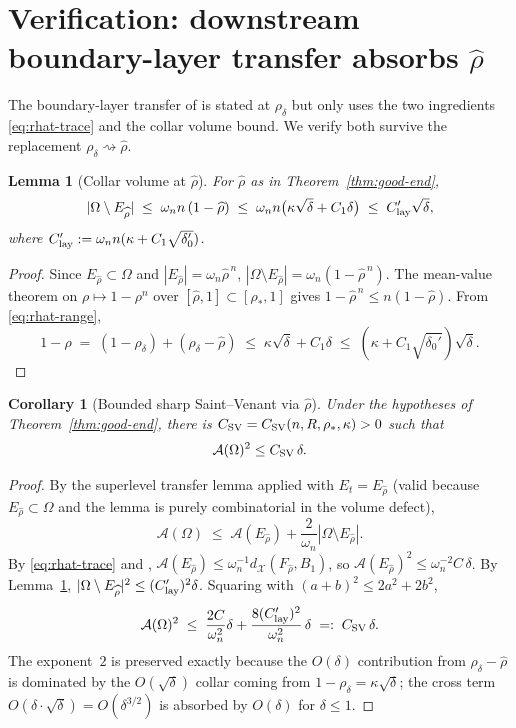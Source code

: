 \documentclass[11pt]{article}
\newtheorem{lemma}[theorem]{Lemma}
\newtheorem{corollary}[theorem]{Corollary}
\theoremstyle{definition}
\newcommand{\Fr}{\mathcal{A}}
\newcommand{\Om}{\Omega}
\newcommand{\rstar}{\rho_{*}}
\newcommand{\rdel}{\rho_\delta}
\newcommand{\rhad}{\widehat\rho}
\newcommand{\X}{\mathcal X}
\begin{document}
\section{Verification: downstream boundary-layer transfer absorbs
$\rhad$}\label{sec:downstream}

The boundary-layer transfer of \cite{BoundaryLayerTransfer} is stated
at $\rdel$ but only uses the two ingredients
\eqref{eq:rhat-trace} and the collar volume bound.  We verify both
survive the replacement $\rdel\rightsquigarrow\rhad$.

\begin{lemma}[Collar volume at $\rhad$]\label{lem:collar-good}
For $\rhad$ as in Theorem~\ref{thm:good-end},
\begin{equation}\label{eq:collar-good}
   |\Om\setminus E_{\rhad}|\;\le\;\omega_n n\,(1-\rhad)
   \;\le\;\omega_n n\bigl(\kappa\sqrt\delta+C_1\delta\bigr)
   \;\le\;C_{\rm lay}'\sqrt\delta,
\end{equation}
where $C_{\rm lay}':=\omega_n n(\kappa+C_1\sqrt{\delta_0'})$.
\end{lemma}

\begin{proof}
Since $E_{\rhad}\subset\Om$ and $|E_{\rhad}|=\omega_n\rhad^{\,n}$,
$|\Om\setminus E_{\rhad}|=\omega_n(1-\rhad^{\,n})$.  The mean-value
theorem on $\rho\mapsto 1-\rho^n$ over $[\rhad,1]\subset[\rstar,1]$
gives $1-\rhad^{\,n}\le n(1-\rhad)$.  From \eqref{eq:rhat-range},
\[
   1-\rhad\;=\;(1-\rdel)+(\rdel-\rhad)\;\le\;\kappa\sqrt\delta+C_1\delta
   \;\le\;(\kappa+C_1\sqrt{\delta_0'})\sqrt\delta.
\]
\end{proof}

\begin{corollary}[Bounded sharp Saint--Venant via $\rhad$]\label{cor:SV-good}
Under the hypotheses of Theorem~\ref{thm:good-end}, there is
$C_{\rm SV}=C_{\rm SV}(n,R,\rstar,\kappa)>0$ such that
\begin{equation}\label{eq:SV-good}
   \Fr(\Om)^{2}\le C_{\rm SV}\,\delta.
\end{equation}
\end{corollary}

\begin{proof}
By the superlevel transfer lemma
\cite[Lemma~4.2]{BoundaryLayerTransfer} applied with $E_t=E_{\rhad}$
(valid because $E_{\rhad}\subset\Om$ and the lemma is purely
combinatorial in the volume defect),
\[
   \Fr(\Om)\;\le\;\Fr(E_{\rhad})+\frac{2}{\omega_n}|\Om\setminus E_{\rhad}|.
\]
By \eqref{eq:rhat-trace} and \cite[Rem.~2.4]{BoundaryLayerTransfer},
$\Fr(E_{\rhad})\le \omega_n^{-1}d_\X(F_{\rhad},B_1)$, so
$\Fr(E_{\rhad})^2\le \omega_n^{-2}C\,\delta$.  By
Lemma~\ref{lem:collar-good},
$|\Om\setminus E_{\rhad}|^2\le (C_{\rm lay}')^2\delta$.
Squaring with $(a+b)^2\le 2a^2+2b^2$,
\[
   \Fr(\Om)^2
   \;\le\; \frac{2C}{\omega_n^{2}}\delta
      + \frac{8(C_{\rm lay}')^2}{\omega_n^{2}}\,\delta
   \;=:\;C_{\rm SV}\,\delta.
\]
The exponent~$2$ is preserved exactly because the $O(\delta)$
contribution from $\rdel-\rhad$ is dominated by the
$O(\sqrt\delta)$ collar coming from $1-\rdel=\kappa\sqrt\delta$; the
cross term $O(\delta\cdot\sqrt\delta)=O(\delta^{3/2})$ is absorbed by
$O(\delta)$ for $\delta\le 1$.
\end{proof}
\end{document}
